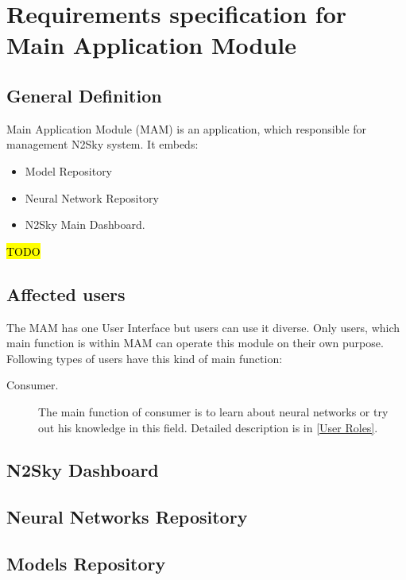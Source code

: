 
\section{Requirements specification for Main Application Module}\label{Requirements specifications for Main Application Module}
\subsection{General Definition}\label{GeneralDefinition main}
Main Application Module (MAM) is an application, which responsible for management N2Sky system. It embeds:
\begin{itemize}
\item Model Repository 
\item Neural Network Repository 
\item N2Sky Main Dashboard.
\end{itemize}
\hl{TODO}
\subsection{Affected users}\label{Affected users MAM}
The MAM has one User Interface but users can use it diverse. Only users, which main function is within MAM can operate this module on their own purpose. Following types of users have this kind of main function:
\begin{description}
\item[Consumer.] The main function of consumer is to learn about neural networks or try out his knowledge in this field. Detailed description is in \autoref{User Roles}. 
\end{description}

\subsection{N2Sky Dashboard}\label{N2Sky Dashboard}
\subsection{Neural Networks Repository}\label{Neural Networks Repository}
\subsection{Models Repository}\label{Models Repository}
